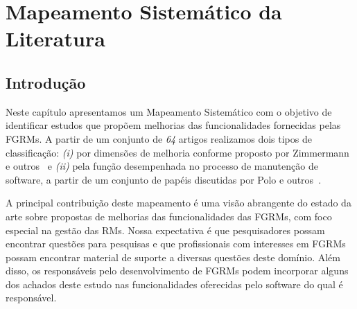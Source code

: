 
\chapter{Mapeamento Sistemático da Literatura}
\label{ch:mapeamento-sistematico}

\section{Introdução}
\label{sec:map-intro}



Neste capítulo apresentamos um Mapeamento Sistemático com o objetivo de
identificar estudos que propõem melhorias das funcionalidades fornecidas pelas
FGRMs. A partir de um conjunto de \textit{64} artigos realizamos dois tipos de
classificação: \textit{(i)} por dimensões de melhoria conforme proposto
por Zimmermann e outros~\cite{zimmermann2009improving} e \textit{(ii)} pela
função desempenhada no processo de manutenção de software, a partir de um
conjunto de papéis discutidas por Polo e outros~\cite{Polo1999}.

A principal contribuição deste mapeamento é uma visão abrangente do estado da
arte sobre propostas de melhorias das funcionalidades das FGRMs, com foco
especial na gestão das RMs. Nossa expectativa é que pesquisadores possam
encontrar questões para pesquisas e que profissionais com interesses em FGRMs
possam encontrar material de suporte a diversas questões deste domínio. Além
disso, os responsáveis pelo desenvolvimento de FGRMs podem incorporar alguns dos
achados deste estudo nas funcionalidades oferecidas pelo software do qual é
responsável.

